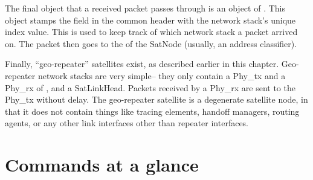 The final object that a received packet passes through is an object of
.  This object stamps the  field
in the common header with the network stack's unique index value.  This
is used to keep track of which network stack a packet arrived on.  The
packet then goes to the  of the SatNode (usually, an address
classifier).  

Finally, ``geo-repeater'' satellites exist, as described earlier in this
chapter.  Geo-repeater network stacks are very simple-- they only contain
a Phy\_tx and a Phy\_rx of , and a SatLinkHead.  
Packets received by a Phy\_rx are sent to the Phy\_tx without delay.  The
geo-repeater satellite is a degenerate satellite node, in that it does not
contain things like tracing elements, handoff managers, routing agents, or 
any other link interfaces other than repeater interfaces.


\section{Commands at a glance}
\label{sec:satcommands}

